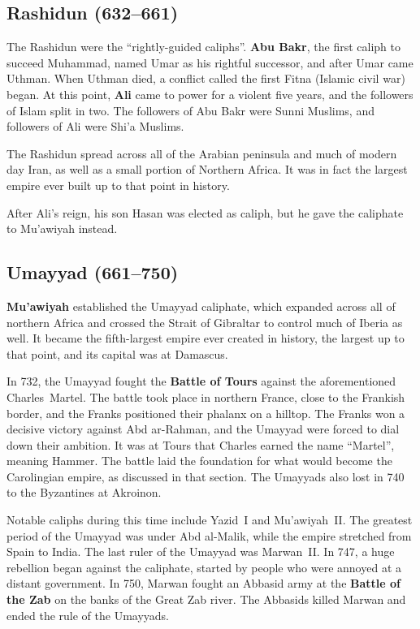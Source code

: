 \subsection*{Rashidun (632--661)}

The Rashidun were the ``rightly-guided caliphs''.
\textbf{Abu Bakr}, the first caliph to succeed Muhammad, named Umar as his rightful successor,
and after Umar came Uthman.
When Uthman died, a conflict called the first Fitna (Islamic civil war) began.
At this point, \textbf{Ali} came to power for a violent five years,
and the followers of Islam split in two.
The followers of Abu Bakr were Sunni Muslims, and followers of Ali were Shi'a Muslims.

The Rashidun spread across all of the Arabian peninsula and much of modern day Iran,
as well as a small portion of Northern Africa.
It was in fact the largest empire ever built up to that point in history.

After Ali's reign, his son Hasan was elected as caliph, but he gave the caliphate to Mu'awiyah instead.

\subsection*{Umayyad (661--750)}

\textbf{Mu'awiyah} established the Umayyad caliphate,
which expanded across all of northern Africa and crossed the Strait of Gibraltar to control much of Iberia as well.
It became the fifth-largest empire ever created in history, the largest up to that point,
and its capital was at Damascus.

In 732, the Umayyad fought the \textbf{Battle of Tours} against the aforementioned Charles~Martel.
The battle took place in northern France, close to the Frankish border,
and the Franks positioned their phalanx on a hilltop.
The Franks won a decisive victory against Abd ar-Rahman, and the Umayyad were forced to dial down their ambition.
It was at Tours that Charles earned the name ``Martel'', meaning Hammer.
The battle laid the foundation for what would become the Carolingian empire, as discussed in that section.
The Umayyads also lost in 740 to the Byzantines at Akroinon.

Notable caliphs during this time include Yazid~I and Mu'awiyah~II\@.
The greatest period of the Umayyad was under Abd al-Malik, while the empire stretched from Spain to India.
The last ruler of the Umayyad was Marwan~II\@.
In 747, a huge rebellion began against the caliphate, started by people who were annoyed at a distant government.
In 750, Marwan fought an Abbasid army at the \textbf{Battle of the Zab} on the banks of the Great Zab river.
The Abbasids killed Marwan and ended the rule of the Umayyads.


